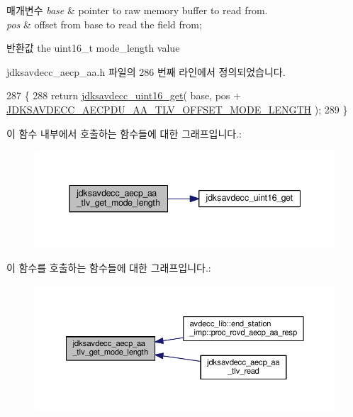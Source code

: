 \begin{DoxyParams}{매개변수}
{\em base} & pointer to raw memory buffer to read from. \\
\hline
{\em pos} & offset from base to read the field from; \\
\hline
\end{DoxyParams}
\begin{DoxyReturn}{반환값}
the uint16\+\_\+t mode\+\_\+length value 
\end{DoxyReturn}


jdksavdecc\+\_\+aecp\+\_\+aa.\+h 파일의 286 번째 라인에서 정의되었습니다.


\begin{DoxyCode}
287 \{
288     \textcolor{keywordflow}{return} \hyperlink{group__endian_ga3fbbbc20be954aa61e039872965b0dc9}{jdksavdecc\_uint16\_get}( base, pos + 
      \hyperlink{group___a_e_c_p___a_a__tlv_ga7670a633c9cea7112916b80201d0f531}{JDKSAVDECC\_AECPDU\_AA\_TLV\_OFFSET\_MODE\_LENGTH} );
289 \}
\end{DoxyCode}


이 함수 내부에서 호출하는 함수들에 대한 그래프입니다.\+:
\nopagebreak
\begin{figure}[H]
\begin{center}
\leavevmode
\includegraphics[width=344pt]{group__aecp__aa__tlv_gab216c61c803887b69f5bed56b7291fe2_cgraph}
\end{center}
\end{figure}




이 함수를 호출하는 함수들에 대한 그래프입니다.\+:
\nopagebreak
\begin{figure}[H]
\begin{center}
\leavevmode
\includegraphics[width=350pt]{group__aecp__aa__tlv_gab216c61c803887b69f5bed56b7291fe2_icgraph}
\end{center}
\end{figure}


